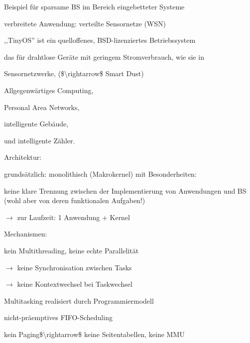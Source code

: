 \documentclass[a4paper]{article}
\begin{document}
\begin{multicols}{3}
    \begin{itemize*}
        \item Beispiel für sparsame BS im Bereich eingebetteter Systeme
        \item verbreitete Anwendung: verteilte Sensornetze (WSN)
        \item ,,TinyOS'' ist ein quelloffenes, BSD-lizenziertes Betriebssystem
        \item das für drahtlose Geräte mit geringem Stromverbrauch, wie sie in
        \begin{itemize*}
            \item Sensornetzwerke, (\$\textbackslash rightarrow\$ Smart Dust)
            \item Allgegenwärtiges Computing,
            \item Personal Area Networks,
            \item intelligente Gebäude,
            \item und intelligente Zähler.
        \end{itemize*}
        \item
        Architektur:
        \begin{itemize*}
            \item grundsätzlich: monolithisch (Makrokernel) mit Besonderheiten:
            \item keine klare Trennung zwischen der Implementierung von Anwendungen und BS (wohl aber von deren funktionalen Aufgaben!)
            \item $\rightarrow$  zur Laufzeit: 1 Anwendung + Kernel
        \end{itemize*}
        \item
        Mechanismen:
        \begin{itemize*}
            \item kein Multithreading, keine echte Parallelität
            \item $\rightarrow$  keine Synchronisation zwischen Tasks
            \item $\rightarrow$  keine Kontextwechsel bei Taskwechsel
            \item Multitasking realisiert durch Programmiermodell
            \item nicht-präemptives FIFO-Scheduling
            \item kein Paging\$\textbackslash rightarrow\$ keine Seitentabellen, keine MMU
        \end{itemize*}
        \item

\end{itemize*}
\end{multicols}
\end{document}
